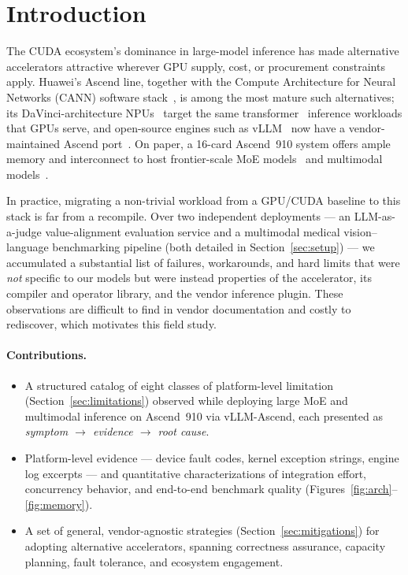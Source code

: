 \documentclass{article}
\begin{document}

\newpage
\tableofcontents
\bigskip
\newpage
\section{Introduction}
The CUDA ecosystem's dominance in large-model inference has made alternative
accelerators attractive wherever GPU supply, cost, or procurement constraints
apply. Huawei's Ascend line, together with the Compute Architecture for Neural
Networks (CANN) software stack~\cite{cann}, is among the most mature such
alternatives; its DaVinci-architecture NPUs~\cite{davinci,ascendhpca} target the
same transformer~\cite{transformer} inference workloads that GPUs serve, and
open-source engines such as vLLM~\cite{vllm} now have a vendor-maintained Ascend
port~\cite{vllmascend}. On paper, a 16-card Ascend~910 system offers ample memory
and interconnect to host frontier-scale MoE models~\cite{deepseekv3,mixtral} and
multimodal models~\cite{qwen2vl,llava}.

In practice, migrating a non-trivial workload from a GPU/CUDA baseline to this
stack is far from a recompile. Over two independent deployments --- an
LLM-as-a-judge value-alignment evaluation service and a multimodal medical
vision--language benchmarking pipeline (both detailed in
Section~\ref{sec:setup}) --- we accumulated a substantial list of failures,
workarounds, and hard limits that were \emph{not} specific to our models but were
instead properties of the accelerator, its compiler and operator library, and the
vendor inference plugin. These observations are difficult to find in vendor
documentation and costly to rediscover, which motivates this field study.

\paragraph{Contributions.}
\begin{itemize}
  \item A structured catalog of eight classes of platform-level limitation
        (Section~\ref{sec:limitations}) observed while deploying large MoE and
        multimodal inference on Ascend~910 via vLLM-Ascend, each presented as
        \emph{symptom $\rightarrow$ evidence $\rightarrow$ root cause}.
  \item Platform-level evidence --- device fault codes, kernel exception strings,
        engine log excerpts --- and quantitative characterizations of integration
        effort, concurrency behavior, and end-to-end benchmark quality
        (Figures~\ref{fig:arch}--\ref{fig:memory}).
  \item A set of general, vendor-agnostic strategies
        (Section~\ref{sec:mitigations}) for adopting alternative accelerators,
        spanning correctness assurance, capacity planning, fault tolerance, and
        ecosystem engagement.
\end{itemize}
\end{document}
